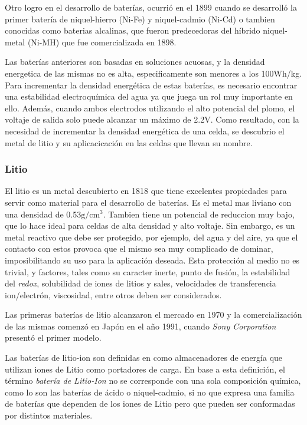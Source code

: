 \documentclass[10pt,a4paper]{article}
\begin{document}
    \noindent Otro logro en el desarrollo de baterías, ocurrió en el 1899 cuando 
    se desarrolló la primer batería de niquel-hierro (Ni-Fe) y niquel-cadmio
    (Ni-Cd) o tambien conocidas como baterias alcalinas, que fueron
    predecedoras del híbrido niquel-metal (Ni-MH) que fue comercializada en
    1898.
    
    \noindent Las baterías anteriores son basadas en soluciones acuosas, y la
    densidad energetica de las mismas no es alta, especificamente son menores a
    los 100Wh/kg. Para incrementar la densidad energética de estas baterías, es necesario
    encontrar una estabilidad electroquímica del agua ya que juega un rol muy
    importante en ello. Además, cuando ambos electrodos utilizando el alto 
    potencial del plomo, el voltaje de salida solo puede alcanzar un 
    máximo de 2.2V. Como resultado, con la necesidad de incrementar la densidad
    energética de una celda, se descubrio el metal de litio y su aplicacicación
    en las celdas que llevan su nombre.

    \subsubsection{Litio}

    El litio es un metal descubierto en 1818 que tiene excelentes 
    propiedades para servir como material para el desarrollo de baterías. 
    Es el metal mas liviano con una densidad de 0.53$\mathrm{g/cm^3}$. 
    Tambien tiene un potencial de reduccion muy bajo, que lo hace ideal para 
    celdas de alta densidad y alto voltaje. Sin embargo, es un metal 
    reactivo que debe ser protegido, por ejemplo, del agua y del aire, 
    ya que el contacto con estos provoca que el mismo sea muy complicado de 
    dominar, imposibilitando su uso para la aplicación deseada. 
    Esta protección al medio no es trivial, y factores, tales como 
    su caracter inerte, punto de fusión, la estabilidad del \emph{redox}, 
    solubilidad de iones de litios y sales, velocidades de transferencia 
    ion/electrón, viscosidad, entre otros deben ser considerados.
    
    \noindent Las primeras baterías de litio alcanzaron el mercado en 1970 y la 
    comercialización de las mismas comenzó en Japón en el año
    1991, cuando \emph{Sony Corporation} presentó el primer modelo.
    
	\noindent Las baterías de litio-ion son definidas en \cite{def_liion} como 
    almacenadores de energía que utilizan iones de Litio como portadores de 
    carga. En base a esta definición, el término \emph{batería de Litio-Ion} no 
    se corresponde con una sola composición química, como lo son las baterías 
    de ácido o niquel-cadmio, si no que expresa una familia de baterías que 
    dependen de los iones de Litio pero que pueden ser conformadas por 
    distintos materiales.
    
\end{document}
